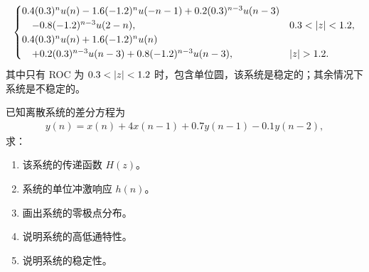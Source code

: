 \begin{solution}
\begin{enumerate}[label=(\arabic*)]
\begin{align*}
\begin{cases}
                    0.4(0.3)^nu(n) - 1.6(-1.2)^nu(-n-1) + 0.2(0.3)^{n - 3}u(n - 3) \\
                    \quad - 0.8(-1.2)^{n - 3}u(2 - n), & 0.3 < \left|z\right| < 1.2, \\
                    0.4(0.3)^nu(n) + 1.6(-1.2)^nu(n) \\
                    \quad + 0.2(0.3)^{n - 3}u(n - 3) + 0.8(-1.2)^{n - 3}u(n - 3), & \left|z\right| > 1.2.
                \end{cases}
            \end{align*}
            其中只有 ROC 为 $0.3 < \left|z\right| < 1.2$ 时，包含单位圆，该系统是稳定的；其余情况下系统是不稳定的。
    \end{enumerate}
\end{solution}

\begin{homework}
    已知离散系统的差分方程为
    \begin{align*}
        y(n) = x(n) + 4x(n - 1) + 0.7y(n - 1) - 0.1y(n - 2),
    \end{align*}
    求：
    \begin{enumerate}[label=(\arabic*)]
        \item 该系统的传递函数 $H(z)$。
        \item 系统的单位冲激响应 $h(n)$。
        \item 画出系统的零极点分布。
        \item 说明系统的高低通特性。
        \item 说明系统的稳定性。
    \end{enumerate}
\end{homework}

